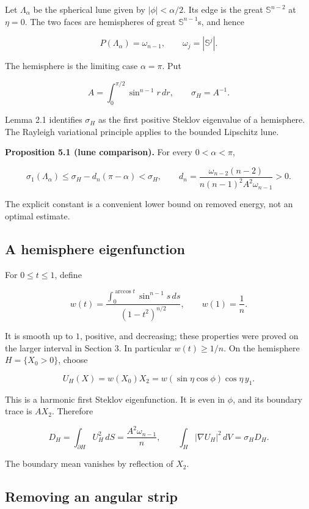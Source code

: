\documentclass[11pt]{article}
\begin{document}
Let \(\Lambda_\alpha\) be the spherical lune given by
\(|\phi|<\alpha/2\). Its edge is the great \(\mathbb S^{n-2}\) at
\(\eta=0\). The two faces are hemispheres of great
\(\mathbb S^{n-1}\)\textquotesingle s, and hence

\[
P(\Lambda_\alpha)=\omega_{n-1},\qquad
\omega_j=|\mathbb S^j|.
\tag{5.2}
\]

The hemisphere is the limiting case \(\alpha=\pi\). Put

\[
A=\int_0^{\pi/2}\sin^{n-1}r\,dr,\qquad
\sigma_H=A^{-1}.
\tag{5.3}
\]

Lemma 2.1 identifies \(\sigma_H\) as the first positive Steklov
eigenvalue of a hemisphere. The Rayleigh variational principle applies
to the bounded Lipschitz lune.

\textbf{Proposition 5.1 (lune comparison).} For every \(0<\alpha<\pi\),

\[
\sigma_1(\Lambda_\alpha)
\leq \sigma_H-d_n(\pi-\alpha)<\sigma_H,
\qquad
d_n=\frac{\omega_{n-2}(n-2)}
{n(n-1)^2A^2\omega_{n-1}}>0.
\tag{5.4}
\]

The explicit constant is a convenient lower bound on removed energy, not
an optimal estimate.

\subsection{A hemisphere
eigenfunction}\label{a-hemisphere-eigenfunction}

For \(0\leq t\leq1\), define

\[
w(t)=
\frac{\displaystyle\int_0^{\arccos t}\sin^{n-1}s\,ds}
{(1-t^2)^{n/2}},
\qquad w(1)=\frac1n.
\tag{5.5}
\]

It is smooth up to \(1\), positive, and decreasing; these properties
were proved on the larger interval in Section 3. In particular
\(w(t)\geq1/n\). On the hemisphere \(H=\{X_0>0\}\), choose

\[
U_H(X)=w(X_0)X_2
=w(\sin\eta\cos\phi)\cos\eta\,y_1.
\tag{5.6}
\]

This is a harmonic first Steklov eigenfunction. It is even in \(\phi\),
and its boundary trace is \(AX_2\). Therefore

\[
D_H=\int_{\partial H}U_H^2\,dS
=\frac{A^2\omega_{n-1}}n,\qquad
\int_H|\nabla U_H|^2\,dV=\sigma_HD_H.
\tag{5.7}
\]

The boundary mean vanishes by reflection of \(X_2\).

\subsection{Removing an angular strip}\label{removing-an-angular-strip}
\end{document}
